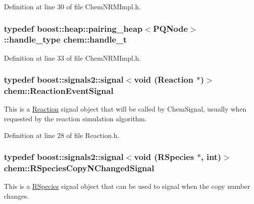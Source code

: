 Definition at line 30 of file Chem\-N\-R\-M\-Impl.\-h.

\hypertarget{namespacechem_a33be80d87771bff54f5cede2e5d81cd1}{
\subsubsection[{handle\-\_\-t}]{\setlength{\rightskip}{0pt plus 5cm}typedef boost\-::heap\-::pairing\-\_\-heap$<${\bf P\-Q\-Node}$>$\-::handle\-\_\-type {\bf chem\-::handle\-\_\-t}}}\label{namespacechem_a33be80d87771bff54f5cede2e5d81cd1}


Definition at line 33 of file Chem\-N\-R\-M\-Impl.\-h.

\hypertarget{namespacechem_a85c409cf931d658d253b62ab5ad35781}{
\subsubsection[{Reaction\-Event\-Signal}]{\setlength{\rightskip}{0pt plus 5cm}typedef boost\-::signals2\-::signal$<$void ({\bf Reaction} $\ast$)$>$ {\bf chem\-::\-Reaction\-Event\-Signal}}}\label{namespacechem_a85c409cf931d658d253b62ab5ad35781}


This is a \hyperlink{classchem_1_1Reaction}{Reaction} signal object that will be called by Chem\-Signal, usually when requested by the reaction simulation algorithm. 



Definition at line 28 of file Reaction.\-h.

\hypertarget{namespacechem_a09aea7e5a24368c13cd7d8d25b4d884e}{
\subsubsection[{R\-Species\-Copy\-N\-Changed\-Signal}]{\setlength{\rightskip}{0pt plus 5cm}typedef boost\-::signals2\-::signal$<$void ({\bf R\-Species} $\ast$, int)$>$ {\bf chem\-::\-R\-Species\-Copy\-N\-Changed\-Signal}}}\label{namespacechem_a09aea7e5a24368c13cd7d8d25b4d884e}


This is a \hyperlink{classchem_1_1RSpecies}{R\-Species} signal object that can be used to signal when the copy number changes. 



